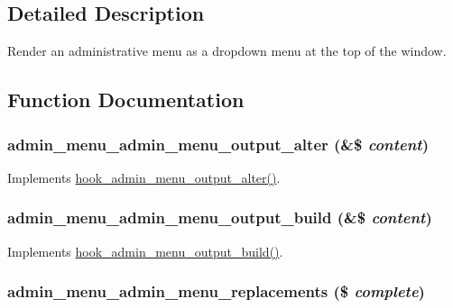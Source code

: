\subsection{Detailed Description}
Render an administrative menu as a dropdown menu at the top of the window. 

\subsection{Function Documentation}
\hypertarget{admin__menu_8module_a6bdd22955ce23f3772000dc38738a9cb}{
\subsubsection[{admin\_\-menu\_\-admin\_\-menu\_\-output\_\-alter}]{\setlength{\rightskip}{0pt plus 5cm}admin\_\-menu\_\-admin\_\-menu\_\-output\_\-alter (\&\$ {\em content})}}
\label{admin__menu_8module_a6bdd22955ce23f3772000dc38738a9cb}
Implements \hyperlink{admin__menu_8api_8php_a7502be228e9b3e1a04cbc17fa0e42b25}{hook\_\-admin\_\-menu\_\-output\_\-alter()}. \hypertarget{admin__menu_8module_a4a1a103aeff9901d8988a2aa5ba95571}{
\subsubsection[{admin\_\-menu\_\-admin\_\-menu\_\-output\_\-build}]{\setlength{\rightskip}{0pt plus 5cm}admin\_\-menu\_\-admin\_\-menu\_\-output\_\-build (\&\$ {\em content})}}
\label{admin__menu_8module_a4a1a103aeff9901d8988a2aa5ba95571}
Implements \hyperlink{admin__menu_8api_8php_a12517a63549c0d184148d7b5ed9907f4}{hook\_\-admin\_\-menu\_\-output\_\-build()}. \hypertarget{admin__menu_8module_a5620a2879f671baacea4a3c84283fc6a}{
\subsubsection[{admin\_\-menu\_\-admin\_\-menu\_\-replacements}]{\setlength{\rightskip}{0pt plus 5cm}admin\_\-menu\_\-admin\_\-menu\_\-replacements (\$ {\em complete})}}
